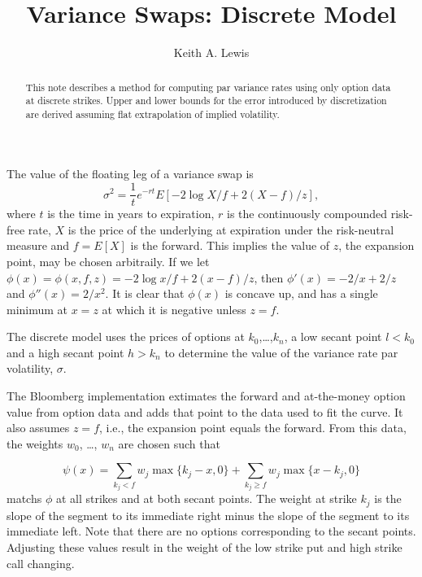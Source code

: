 \documentclass[11pt,fleqn]{amsart}
\begin{document}
\title{Variance Swaps: Discrete Model}
\author{Keith A. Lewis}

\begin{abstract}
This note describes a method for computing par variance rates using
only option data at discrete strikes. Upper and lower bounds for the
error introduced by discretization are derived assuming
flat extrapolation of implied volatility.
\end{abstract}

\maketitle

The value of the floating leg of a variance swap is
\begin{equation*}
	\sigma^2 = \frac{1}{t}e^{-rt} E[-2\log X/f + 2(X - f)/z],
\end{equation*}
where $t$ is the time in years to expiration, $r$ is the continuously
compounded risk-free rate, $X$ is the price of the
underlying at expiration under the risk-neutral measure and $f = E[X]$
is the forward. This implies the value of $z$, the expansion point,
may be chosen arbitraily. If we let $\phi(x) = \phi(x, f, z)
= -2\log x/f + 2(x - f)/z$, then $\phi'(x) = -2/x + 2/z$ and
$\phi''(x) = 2/x^2$. It is clear that $\phi(x)$ is concave up,
and has a single minimum at $x = z$ at which it is negative unless
$z = f$.

The discrete model uses the prices of options at $k_0$,\dots,$k_n$, a
low secant point $l < k_0$ and a high secant point $h > k_n$ to determine
the value of the variance rate par volatility, $\sigma$.

The Bloomberg implementation extimates the forward and at-the-money
option value from option data and adds that point to the data used to
fit the curve. It also assumes $z = f$, i.e., the expansion point equals
the forward. From this data, the weights $w_0$, \dots, $w_n$ are chosen
such that

\begin{equation*}
	\psi(x) = \sum_{k_j < f} w_j \max\{k_j - x, 0\}
		+ \sum_{k_j \ge f} w_j \max\{x - k_j, 0\}
\end{equation*}
matchs $\phi$ at all strikes and at both secant points. The weight at
strike $k_j$ is the slope of the segment to its immediate right minus
the slope of the segment to its immediate left. Note that there are
no options corresponding to the secant points. Adjusting these values
result in the weight of the low strike put and high strike call changing.
\end{document}
